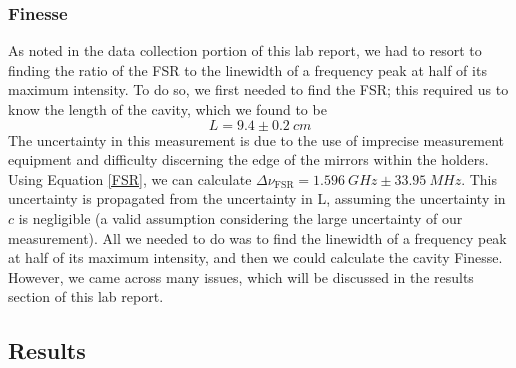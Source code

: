 \documentclass[twocolumn,amsmath,amssymb,pra]{revtex4-2}
\newcommand{\sub}[1]{_\textrm{#1}}
\begin{document}
\subsubsection{Finesse}
As noted in the data collection portion of this lab report, we had to resort to finding the ratio of the FSR to the linewidth of a frequency peak at half of its maximum intensity. To do so, we first needed to find the FSR; this required us to know the length of the cavity, which we found to be 
\begin{equation}
    L = 9.4 \pm 0.2 \ \si{cm}
\end{equation}
The uncertainty in this measurement is due to the use of imprecise measurement equipment and difficulty discerning the edge of the mirrors within the holders. Using Equation \ref{FSR}, we can calculate $\Delta \nu{}\sub{FSR} = 1.596 \ \si{GHz}\pm 33.95 \ \si{MHz}$. This uncertainty is propagated from the uncertainty in L, assuming the uncertainty in $c$ is negligible (a valid assumption considering the large uncertainty of our measurement). All we needed to do was to find the linewidth of a frequency peak at half of its maximum intensity, and then we could calculate the cavity Finesse. However, we came across many issues, which will be discussed in the results section of this lab report.

\subsection{Results}
\end{document}
